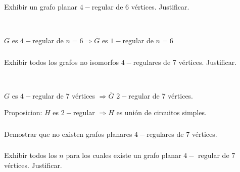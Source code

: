 \subsubsection{}
Exhibir un grafo planar $4-$regular de 6 vértices. Justificar.

~

$G$ es $4-$regular de $n = 6 \Longrightarrow \overline{G}$ es $1-$regular de $n = 6$

\subsubsection{}
Exhibir todos los grafos no isomorfos $4-$regulares de 7 vértices. Justificar.

~

$G$ es $4-$regular de 7 vértices $\Longrightarrow \overline{G}$ $2-$regular de 7 vértices.

Proposicion: $H$ es $2-$regular $\Longrightarrow H$ es unión de circuitos simples.

\subsubsection{}
Demostrar que no existen grafos planares $4-$regulares de 7 vértices.

\subsubsection{}
Exhibir todos los $n$ para los cuales existe un grafo planar $4-$ regular de 7 vértices. Justificar.
